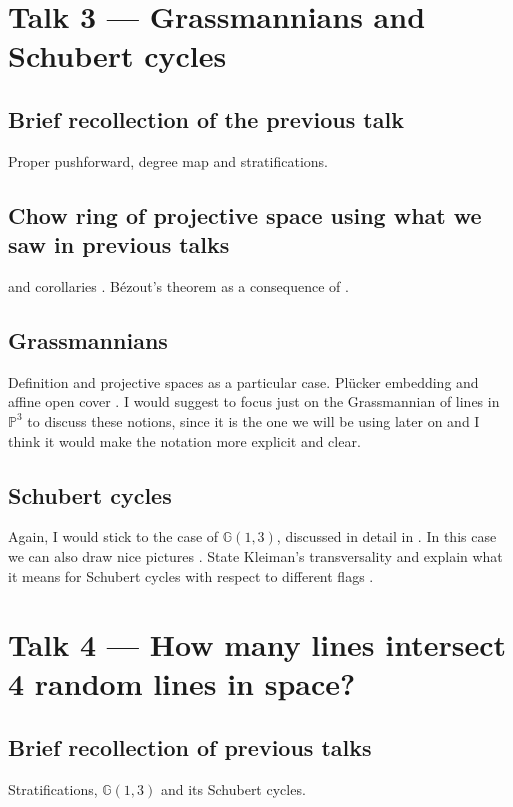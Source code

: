 \documentclass[A4paper, 12pt, british, reqno]{amsart}
\newcommand{\bbG}{\mathbb{G}}
\renewcommand{\P}{\mathbb{P}} %
\theoremstyle{plain}
\theoremstyle{definition}
\theoremstyle{remark}
\theoremstyle{plain}
\theoremstyle{definition}
\theoremstyle{remark}
\theoremstyle{plain}
\theoremstyle{definition}
\theoremstyle{remark}
\begin{document}
\section{Talk 3 --- Grassmannians and Schubert cycles}

\subsection{Brief recollection of the previous talk}
Proper pushforward, degree map and stratifications.

\subsection{Chow ring of projective space using what we saw in previous talks} \cite[Thm.~2.1]{eh16} and corollaries \cite[Cor.~2.2 and Cor.~2.3]{eh16}.
Bézout's theorem as a consequence of \cite[Thm.~2.1]{eh16}.

\subsection{Grassmannians}
Definition and projective spaces as a particular case.
Pl\"{u}cker embedding \cite[\S 3.2.1]{eh16} and affine open cover \cite[\S 3.2.2]{eh16}.
I would suggest to focus just on the Grassmannian of lines in $\P^{3}$ to discuss these notions, since it is the one we will be using later on and I think it would make the notation more explicit and clear.

\subsection{Schubert cycles}
Again, I would stick to the case of $\bbG(1,3)$, discussed in detail in \cite[\S 3.3.1]{eh16}.
In this case we can also draw nice pictures \cite[Fig.~3.3]{eh16}.
State Kleiman's transversality \cite[Thm.~1.7]{eh16} and explain what it means for Schubert cycles with respect to different flags \cite[p.~105]{eh16}.

\section{Talk 4 --- How many lines intersect 4 random lines in space?}

\subsection{Brief recollection of previous talks}
Stratifications, $\bbG(1,3)$ and its Schubert cycles.
\end{document}
